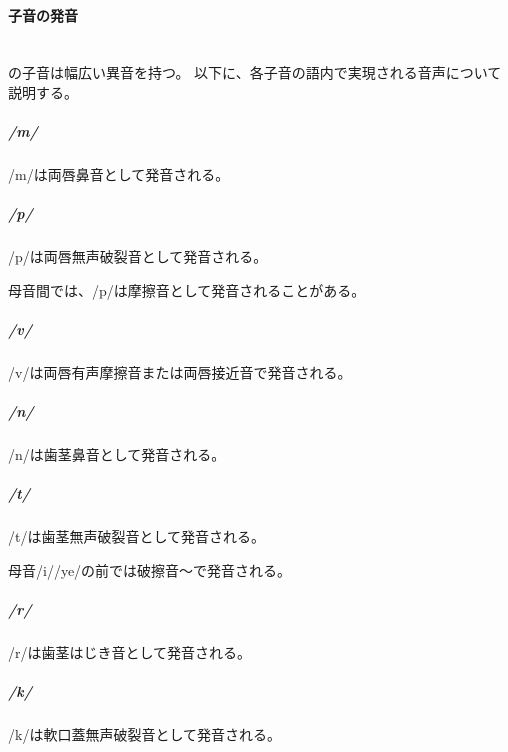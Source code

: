 \paragraph{子音の発音}\quad\\
\langname の子音は幅広い異音を持つ。
以下に、各子音の語内で実現される音声について説明する。

\subparagraph{/m/}
/m/は両唇鼻音\textipa{[m]}として発音される。

\subparagraph{/p/}
/p/は両唇無声破裂音\textipa{[p]}として発音される。

母音間では、/p/は摩擦音\textipa{[F]}として発音されることがある。

\subparagraph{/v/}
/v/は両唇有声摩擦音\textipa{[B]}または両唇接近音\textipa{[\textlowering{B}]}で発音される。

\subparagraph{/n/}
/n/は歯茎鼻音\textipa{[n]}として発音される。

\subparagraph{/t/}
/t/は歯茎無声破裂音\textipa{[t]}として発音される。

母音/i//ye/の前では破擦音\textipa{[\t{ts}]}～\textipa{[\t{tS}]}で発音される。

\subparagraph{/r/}
/r/は歯茎はじき音\textipa{[R]}として発音される。

\subparagraph{/k/}
/k/は軟口蓋無声破裂音\textipa{[k]}として発音される。

